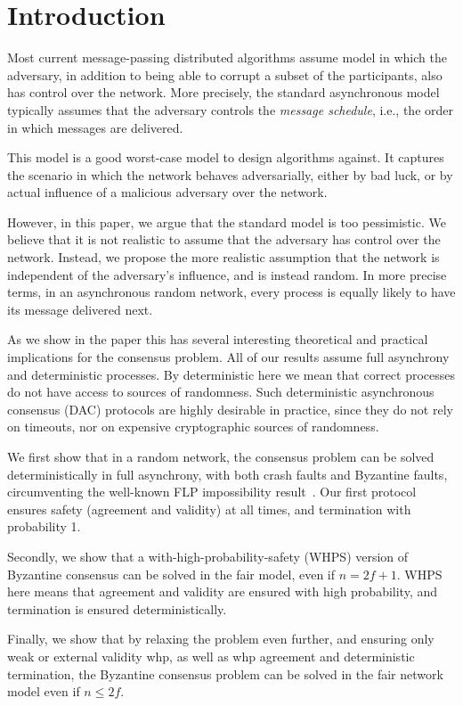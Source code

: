 \section{Introduction}\label{sec:intro}

Most current message-passing distributed algorithms assume model in which the adversary, in addition to being able to corrupt a subset of the participants, also has control over the network. More precisely, the standard asynchronous model typically assumes that the adversary controls the \textit{message schedule}, i.e., the order in which messages are delivered.

This model is a good worst-case model to design algorithms against. It captures the scenario in which the network behaves adversarially, either by bad luck, or by actual influence of a malicious adversary over the network.

However, in this paper, we argue that the standard model is too pessimistic. We believe that it is not realistic to assume that the adversary has control over the network. Instead, we propose the more realistic assumption that the network is independent of the adversary's influence, and is instead random. In more precise terms, in an asynchronous random network, every process is equally likely to have its message delivered next.

As we show in the paper this has several interesting theoretical and practical implications for the consensus problem. All of our results assume full asynchrony and deterministic processes. By deterministic here we mean that correct processes do not have access to sources of randomness. Such deterministic asynchronous consensus (DAC) protocols are highly desirable in practice, since they do not rely on timeouts, nor on expensive cryptographic sources of randomness.

We first show that in a random network, the consensus problem can be solved deterministically in full asynchrony, with both crash faults and Byzantine faults, circumventing the well-known FLP impossibility result~\cite{FLP}.  Our first protocol ensures safety (agreement and validity) at all times, and termination with probability 1. 

Secondly, we show that a with-high-probability-safety (WHPS) version of Byzantine consensus can be solved in the fair model, even if $n=2f+1$. WHPS here means that agreement and validity are ensured with high probability, and termination is ensured deterministically.

Finally, we show that by relaxing the problem even further, and ensuring only weak or external validity whp, as well as whp agreement and deterministic termination, the Byzantine consensus problem can be solved in the fair network model even if $n \leq 2f$.

